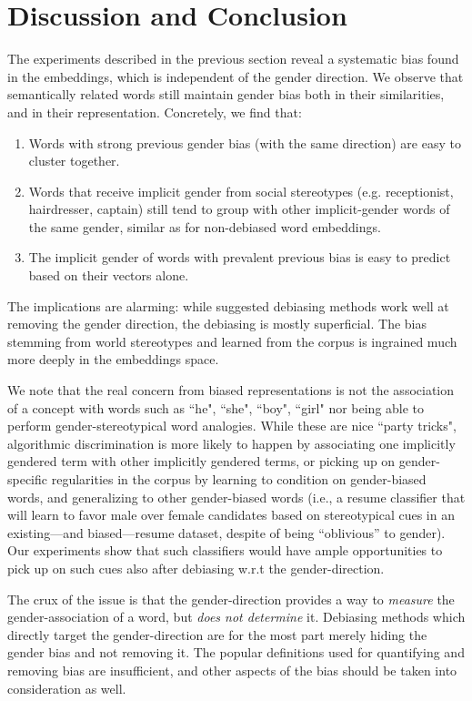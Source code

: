\documentclass[11pt,a4paper]{article}
\begin{document}
	\section{Discussion and Conclusion}
	\label{discussion}
	
	The experiments described in the previous section reveal a systematic bias found in the embeddings, which is independent of the gender direction. We observe that semantically related words still maintain gender bias both in their similarities, and in their representation. Concretely, we find that: 
	
	\begin{enumerate}
		\item Words with strong previous gender bias (with the same direction) are easy to cluster together.
		\item Words that receive implicit gender from social stereotypes (e.g. receptionist, hairdresser, captain) still tend to group with other implicit-gender words of the same gender, similar as for non-debiased word embeddings.
		\item The implicit gender of words with prevalent previous bias is easy to predict based on their vectors alone.
	\end{enumerate}
	
	The implications are alarming: while suggested debiasing methods work well 
	at removing the gender direction, the debiasing is mostly superficial. The bias stemming from world stereotypes and learned from the corpus is ingrained much more deeply in the embeddings space.
	
	We note that the real concern from biased representations is not the association of a concept with words such as ``he", ``she", ``boy", ``girl" nor being able to perform gender-stereotypical word analogies. While these are nice ``party tricks", algorithmic discrimination is more likely to happen by associating one implicitly gendered term with other implicitly gendered terms, or picking up on gender-specific regularities in the corpus by learning to condition on gender-biased words, and generalizing to other gender-biased words (i.e., a resume classifier that will learn to favor male over female candidates based on stereotypical cues in an existing---and biased---resume dataset, despite of being ``oblivious'' to gender). Our experiments show that such classifiers would have ample opportunities to pick up on such cues also after debiasing w.r.t the gender-direction.
	
	The crux of the issue is that the gender-direction provides a way to \emph{measure} the gender-association of a word, but \emph{does not determine} it.
	Debiasing methods which directly target the gender-direction are for the most part merely hiding the gender bias and not removing it. The popular definitions used for quantifying and removing bias are insufficient, and other aspects of the bias should be taken into consideration as well.	
	
\end{document}

